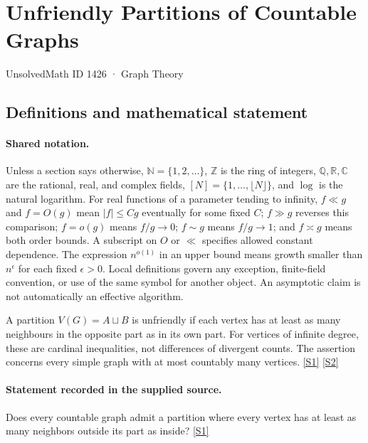 \documentclass[11pt,a4paper]{article}
\newcommand{\N}{\mathbb{N}}
\newcommand{\Z}{\mathbb{Z}}
\newcommand{\Q}{\mathbb{Q}}
\newcommand{\R}{\mathbb{R}}
\newcommand{\C}{\mathbb{C}}
\newcommand{\sref}[2]{\hyperlink{source:#1:#2}{[S#2]}}
\begin{document}

\setcounter{section}{1425}

\section{Unfriendly Partitions of Countable Graphs}\label{1426}

{\small\sffamily UnsolvedMath ID 1426 · Graph Theory}

\subsection{Definitions and mathematical statement}

\paragraph{Shared notation.}Unless a section says otherwise, $\N=\{1,2,\ldots\}$,
$\Z$ is the ring of integers, $\Q,\R,\C$ are the rational, real, and complex
fields, $[N]=\{1,\ldots,\lfloor N\rfloor\}$, and $\log$ is the natural
logarithm. For real functions of a parameter tending to infinity,
$f\ll g$ and $f=O(g)$ mean $|f|\leq Cg$ eventually for some fixed $C$;
$f\gg g$ reverses this comparison; $f=o(g)$ means $f/g\to0$;
$f\sim g$ means $f/g\to1$; and $f\asymp g$ means both order bounds.
A subscript on $O$ or $\ll$ specifies allowed constant dependence.
The expression $n^{o(1)}$ in an upper bound means growth smaller than
$n^\epsilon$ for each fixed $\epsilon>0$. Local definitions govern any
exception, finite-field convention, or use of the same symbol for another
object. An asymptotic claim is not automatically an effective algorithm.



A partition $V(G)=A\sqcup B$ is unfriendly if each vertex has at least as many neighbours in the opposite part as in its own part. For vertices of infinite degree, these are cardinal inequalities, not differences of divergent counts. The assertion concerns every simple graph with at most countably many vertices. \sref{1426}{1} \sref{1426}{2}

\paragraph{Statement recorded in the supplied source.}
Does every countable graph admit a partition where every vertex has at least as many neighbors outside its part as inside? \sref{1426}{1}
\end{document}
